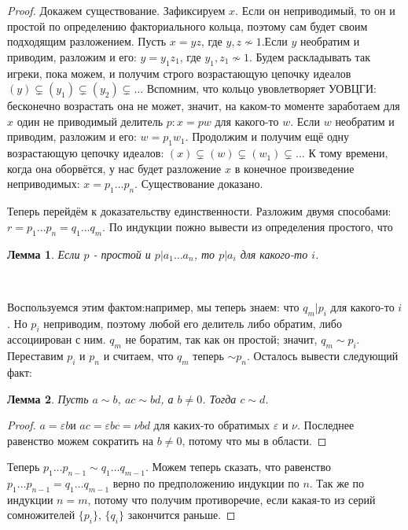 \documentclass[a4paper,100pt]{article}
\theoremstyle{indented}
\newtheorem{lemma}{Лемма}
\theoremstyle{definition}
\theoremstyle{remark}
\begin{document}
\begin{proof}
    Докажем существование. Зафиксируем $x$. Если он неприводимый, то он и простой по определению факториального кольца, поэтому сам будет своим подходящим разложением. Пусть $x=yz$, где $y, z \nsim 1$.Если $y$ необратим и приводим, разложим и его: $y=y_1 z_1$, где $y_1, z_1 \nsim 1$. Будем раскладывать так игреки, пока можем, и получим строго возрастающую цепочку идеалов $(y)\subsetneq(y_1)\subsetneq(y_2)\subsetneq\dots$ Вспомним, что кольцо увовлетворяет УОВЦГИ: бесконечно возрастать она не может, значит, на каком-то моменте заработаем для $x$ один не приводимый делитель $p: x=pw$ для какого-то $w$. Если $w$ необратим и приводим, разложим и его: $w=p_1 w_1$. Продолжим и получим ещё одну возрастающую цепочку идеалов: $(x)\subsetneq (w)\subsetneq (w_1)\subsetneq \dots$ К тому времени, когда она оборвётся, у нас будет разложение $x$ в конечное произведение неприводимых: $x=p_1\dots p_n$. Существование доказано.\ 

    Теперь перейдём к доказательству единственности. Разложим двумя способами: $r=p_1\dots p_n=q_1\dots q_m$. По индукции пожно вывести из определения простого, что\\

    \begin{lemma}
        Если $p$ - простой и $p\vert a_1\dots a_n$, то $p\vert a_i$ для какого-то $i$.
    \end{lemma}\

    Воспользуемся этим фактом:например, мы теперь знаем: что $q_m\vert p_i$ для какого-то $i$. Но $p_i$ неприводим, поэтому любой его делитель либо обратим, либо ассоциирован с ним. $q_m$ не боратим, так как он простой; значит, $q_m \sim p_i$. Переставим $p_i$ и $p_n$ и считаем, что $q_m$ теперь $\sim p_n$. Осталось вывести следующий факт:\\

    \begin{lemma}
        Пусть $a\sim b$, $ac\sim bd$, а $b\neq 0$. Тогда $c\sim d$.
    \end{lemma}

    \begin{proof}
        $a=\varepsilon b$и $ac=\varepsilon bc =\nu bd$ для каких-то обратимых $\varepsilon$ и $\nu$. Последнее равенство можем сократить на $b\neq 0$, потому что мы в области.
    \end{proof}

    Теперь $p_1\dots p_{n-1}\sim q_1\dots q_{m-1}$. Можем теперь сказать, что равенство $p_1\dots p_{n-1} = q_1\dots q_{m-1}$ верно по предположению индукции по $n$. Так же по индукции $n=m$, потому что получим противоречие, если какая-то из серий сомножителей $\{p_i\}$, $\{q_i\}$ закончится раньше.
\end{proof}
\end{document}

